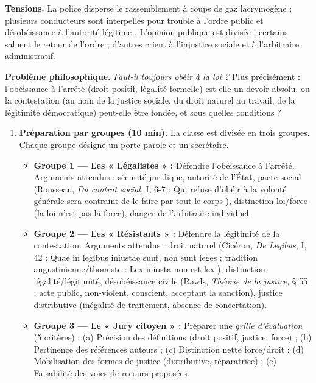 \documentclass[11pt]{article}
\newcounter{popsec}
\newcounter{popsub}
\newcommand{\courssub}[1]{%
  \stepcounter{popsub}%
  \par\vspace{9pt}\noindent{\popxbold\fontsize{11.5}{13}\selectfont\color{popink}{\color{poporange}\thepopsec.\thepopsub}\hspace{6pt}#1}\par\nopagebreak\vspace{4pt}
}
\begin{document}
\textbf{Tensions.} La police disperse le rassemblement à coups de gaz lacrymogène ; plusieurs conducteurs sont interpellés pour \guillemotleft trouble à l'ordre public \guillemotright et \guillemotleft désobéissance à l'autorité légitime \guillemotright. L'opinion publique est divisée : certains saluent le retour de l'ordre ; d'autres crient à l'injustice sociale et à l'arbitraire administratif.

\textbf{Problème philosophique.} \emph{Faut-il toujours obéir à la loi ?} Plus précisément : l'obéissance à l'arrêté (droit positif, légalité formelle) est-elle un devoir absolu, ou la contestation (au nom de la justice sociale, du droit naturel au travail, de la légitimité démocratique) peut-elle être fondée, et sous quelles conditions ?

\courssub{Consignes}
\begin{enumerate}
    \item \textbf{Préparation par groupes (10 min).} La classe est divisée en trois groupes. Chaque groupe désigne un porte-parole et un secrétaire.
    \begin{itemize}
        \item \textbf{Groupe 1 — Les « Légalistes » :} Défendre l'obéissance à l'arrêté. Arguments attendus : sécurité juridique, autorité de l'État, pacte social (Rousseau, \emph{Du contrat social}, I, 6-7 : \guillemotleft Qui refuse d'obéir à la volonté générale sera contraint de le faire par tout le corps \guillemotright), distinction loi/force (la loi n'est pas la force), danger de l'arbitraire individuel.
        \item \textbf{Groupe 2 — Les « Résistants » :} Défendre la légitimité de la contestation. Arguments attendus : droit naturel (Cicéron, \emph{De Legibus}, I, 42 : \guillemotleft Quae in legibus iniustae sunt, non sunt leges \guillemotright ; tradition augustinienne/thomiste : \guillemotleft Lex iniusta non est lex \guillemotright), distinction légalité/légitimité, désobéissance civile (Rawls, \emph{Théorie de la justice}, § 55 : acte public, non-violent, conscient, acceptant la sanction), justice distributive (inégalité de traitement, absence de concertation).
        \item \textbf{Groupe 3 — Le « Jury citoyen » :} Préparer une \emph{grille d'évaluation} (5 critères) : (a) Précision des définitions (droit positif, justice, force) ; (b) Pertinence des références auteurs ; (c) Distinction nette force/droit ; (d) Mobilisation des formes de justice (distributive, réparatrice) ; (e) Faisabilité des voies de recours proposées.

\end{itemize}
\end{enumerate}
\end{document}
